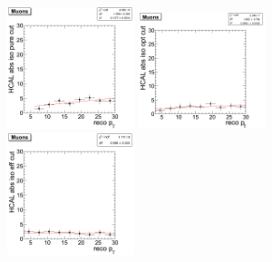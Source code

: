 \begin{figure}[htbp]
   \includegraphics[width = 0.33\textwidth]{pictures/optIsoCut/hcalIso_muon_pure.png}
   \includegraphics[width = 0.33\textwidth]{pictures/optIsoCut/hcalIso_muon_opt.png}
   \includegraphics[width = 0.33\textwidth]{pictures/optIsoCut/hcalIso_muon_eff.png}
   \label{fig:optHcalIso_muon}
\end{figure}
